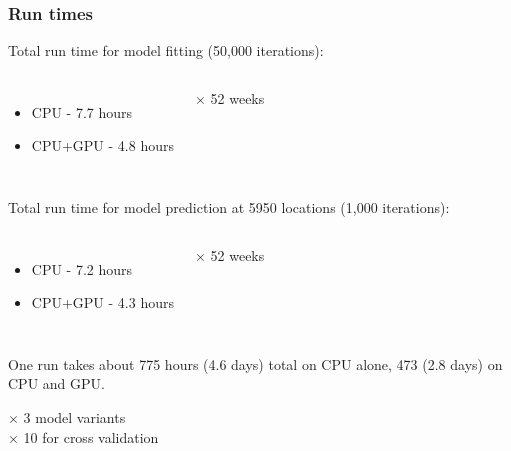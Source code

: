 \documentclass[t]{beamer}\usepackage[]{graphicx}\usepackage[]{color}
\begin{document}
\begin{frame}
\frametitle{Run times}

Total run time for model fitting (50,000 iterations): \\ \vspace{2mm}

\begin{columns}[c]
\begin{itemize}
\item CPU - 7.7 hours
\item CPU+GPU - 4.8 hours
\end{itemize}
$\times$ 52 weeks
\end{columns}

\vspace{2mm} \pause

Total run time for model prediction at 5950 locations (1,000 iterations): \\ \vspace{2mm}

\begin{columns}[c]
\begin{itemize}
\item CPU - 7.2 hours
\item CPU+GPU - 4.3 hours
\end{itemize}
$\times$ 52 weeks
\end{columns}

\vspace{2mm}\pause

One run takes about 775 hours (4.6 days) total on CPU alone, 473 (2.8 days) on CPU and GPU. 

\pause

\begin{center}
$\times$ 3 model variants\\
$\times$ 10 for cross validation
\end{center}

\end{frame}

\end{document}
